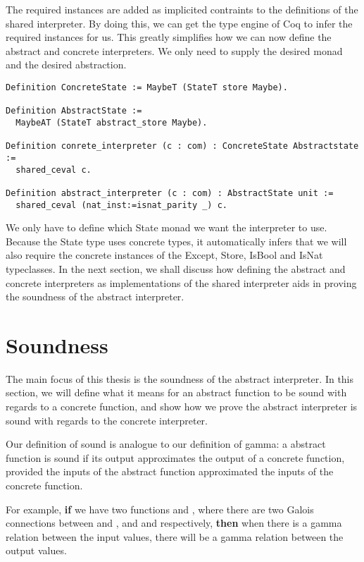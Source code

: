 The required instances are added as implicited contraints to the definitions of
the shared interpreter. By doing this, we can get the type engine of Coq to
infer the required instances for us. This greatly simplifies how we can now
define the abstract and concrete interpreters. We only need to supply the
desired monad and the desired abstraction.

\begin{verbatim}
Definition ConcreteState := MaybeT (StateT store Maybe).

Definition AbstractState := 
  MaybeAT (StateT abstract_store Maybe).

Definition conrete_interpreter (c : com) : ConcreteState Abstractstate :=
  shared_ceval c.

Definition abstract_interpreter (c : com) : AbstractState unit :=
  shared_ceval (nat_inst:=isnat_parity _) c.
\end{verbatim}

We only have to define which State monad we want the interpreter to use.
Because the State type uses concrete types, it automatically infers that we
will also require the concrete instances of the Except, Store, IsBool and IsNat
typeclasses. In the next section, we shall discuss how defining the abstract
and concrete interpreters as implementations of the shared interpreter aids in
proving the soundness of the abstract interpreter.

\section{Soundness}\label{sec:soundness}
The main focus of this thesis is the soundness of the abstract interpreter. In
this section, we will define what it means for an abstract function to be sound
with regards to a concrete function, and show how we prove the abstract 
interpreter is sound with regards to the concrete interpreter. 

Our definition of sound is analogue to our definition of gamma: a abstract 
function is sound if its output approximates the output of a concrete function,
provided the inputs of the abstract function approximated the inputs of the
concrete function.

For example, \textbf{if} we have two functions  and , where there are two Galois connections 
between  and , and  and  respectively, 
\textbf{then} when 
there is a gamma relation between the input values, there will be a gamma
relation between the output values.

